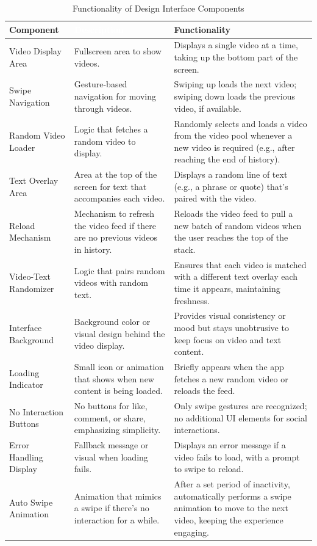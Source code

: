 \documentclass{article}
\begin{document}
\begin{table}[H]
\centering
\renewcommand{\arraystretch}{1.5}
\setlength{\tabcolsep}{12pt}
    \begin{tabularx}{\textwidth}{|l|X|X|}
        \hline
        \cellcolor{TikTokRed}\textbf{Component} & \cellcolor{TikTokBlack}\textbf{\textcolor{white}{Description}} & \cellcolor{TikTokLightBlue}\textbf{Functionality} \\
        \hline
        Video Display Area & Fullscreen area to show videos. & Displays a single video at a time, taking up the bottom part of the screen. \\
        \hline
        Swipe Navigation & Gesture-based navigation for moving through videos. & Swiping up loads the next video; swiping down loads the previous video, if available. \\
        \hline
        Random Video Loader & Logic that fetches a random video to display. & Randomly selects and loads a video from the video pool whenever a new video is required (e.g., after reaching the end of history). \\
        \hline
        Text Overlay Area & Area at the top of the screen for text that accompanies each video. & Displays a random line of text (e.g., a phrase or quote) that’s paired with the video. \\
        \hline
        Reload Mechanism & Mechanism to refresh the video feed if there are no previous videos in history. & Reloads the video feed to pull a new batch of random videos when the user reaches the top of the stack. \\
        \hline
        Video-Text Randomizer & Logic that pairs random videos with random text. & Ensures that each video is matched with a different text overlay each time it appears, maintaining freshness. \\
        \hline
        Interface Background & Background color or visual design behind the video display. & Provides visual consistency or mood but stays unobtrusive to keep focus on video and text content. \\
        \hline
        Loading Indicator & Small icon or animation that shows when new content is being loaded. & Briefly appears when the app fetches a new random video or reloads the feed. \\
        \hline
        No Interaction Buttons & No buttons for like, comment, or share, emphasizing simplicity. & Only swipe gestures are recognized; no additional UI elements for social interactions. \\
        \hline
        Error Handling Display & Fallback message or visual when loading fails. & Displays an error message if a video fails to load, with a prompt to swipe to reload. \\
        \hline
        Auto Swipe Animation & Animation that mimics a swipe if there’s no interaction for a while. & After a set period of inactivity, automatically performs a swipe animation to move to the next video, keeping the experience engaging. \\
        \hline
    \end{tabularx}
    \caption{Functionality of Design Interface Components}
\end{table}
\end{document}
